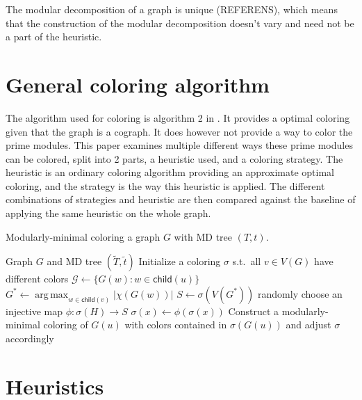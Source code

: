 \documentclass{amsart}
\newcommand{\child}{\mathsf{child}}
\DeclareMathOperator*{\argmax}{arg\,max}
\newcommand{\T}{\widetilde{T}}
\renewcommand{\t}{\widetilde{t}}
\begin{document}
The modular decomposition of a graph is unique (REFERENS), which means that the
construction of the modular decomposition doesn't vary and need not be a part of
the heuristic.


\section{General coloring algorithm}

The algorithm used for coloring is algorithm 2 in \cite{HCL}. It provides a
optimal coloring given that the graph is a cograph. It does however not
provide a way to color the prime modules. This paper examines multiple different
ways these prime modules can be colored, split into 2 parts, a heuristic used,
and a coloring strategy. The heuristic is an ordinary coloring algorithm
providing an approximate optimal coloring, and the strategy is the way this
heuristic is applied. The different combinations of strategies and heuristic are
then compared against the baseline of applying the same heuristic on the whole
graph.

\begin{algorithm}[H]
  \caption{Modularly-minimal coloring a graph $G$ with MD tree $(T,t)$.}
  \label{alg:modmin}
  \begin{algorithmic}[1]
    \REQUIRE Graph $G$ and MD tree $(\T,\t)$
    \STATE Initialize a coloring $\sigma$ s.t.\ all $v \in V(G)$
           have different colors
          \STATE $\mathcal{G} \leftarrow \{G(w)\colon w\in\child(u)\}$ 
          \STATE $G^* \leftarrow \argmax_{w\in\child(v)} |\chi(G(w))|$
          \STATE $S \leftarrow \sigma(V(G^*))$ 
             \STATE randomly choose an injective map $\phi:\sigma(H)\to S$
                \STATE $\sigma(x)\leftarrow \phi(\sigma(x))$  
             \ENDFOR
          \ENDFOR
          \STATE Construct a modularly-minimal coloring of $G(u)$
              with colors contained in $\sigma(G(u))$
              and adjust $\sigma$ accordingly \label{alg:prime-color}
       \ENDIF
    \ENDFOR
  \end{algorithmic}
\end{algorithm}



\section{Heuristics}
\label{sec:Heuristics}
\end{document}
